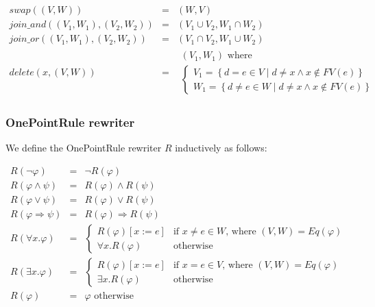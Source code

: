 \begin{equation*}
\begin{array}{lll}
swap\left( \left( V,W\right) \right) & = & \left( W,V\right) \\ 
join\_and\left( \left( V_{1},W_{1}\right) ,\left( V_{2},W_{2}\right) \right)
& = & \left( V_{1}\cup V_{2},W_{1}\cap W_{2}\right) \\ 
join\_or\left( \left( V_{1},W_{1}\right) ,\left( V_{2},W_{2}\right) \right)
& = & \left( V_{1}\cap V_{2},W_{1}\cup W_{2}\right) \\ 
delete\left( x,\left( V,W\right) \right) & = & 
\begin{array}{l}
\left( V_{1},W_{1}\right) \text{ where} \\ 
\left\{ 
\begin{array}{c}
V_{1}=\left\{ d=e\in V\mid d\neq x\wedge x\notin FV(e)\right\} \\ 
W_{1}=\left\{ d\neq e\in W\mid d\neq x\wedge x\notin FV(e)\right\}%
\end{array}%
\right.%
\end{array}%
\end{array}%
\end{equation*}

\subsubsection{OnePointRule rewriter}

We define the OnePointRule rewriter $R$ inductively as follows:

\begin{equation*}
\begin{array}{lll}
R\left( \lnot \varphi \right) & = & \lnot R\left( \varphi \right) \\ 
R\left( \varphi \wedge \psi \right) & = & R\left( \varphi \right) \wedge
R\left( \psi \right) \\ 
R\left( \varphi \vee \psi \right) & = & R\left( \varphi \right) \vee R\left(
\psi \right) \\ 
R\left( \varphi \Rightarrow \psi \right) & = & R\left( \varphi \right)
\Rightarrow R\left( \psi \right) \\ 
R\left( \forall x.\varphi \right) & = & \left\{ 
\begin{array}{cc}
R\left( \varphi \right) \left[ x:=e\right] & \text{if }x\neq e\in W\text{,
where }\left( V,W\right) =Eq\left( \varphi \right) \\ 
\forall x.R\left( \varphi \right) & \text{otherwise}%
\end{array}%
\right. \\ 
R\left( \exists x.\varphi \right) & = & \left\{ 
\begin{array}{cc}
R\left( \varphi \right) \left[ x:=e\right] & \text{if }x=e\in V\text{, where 
}\left( V,W\right) =Eq\left( \varphi \right) \\ 
\exists x.R\left( \varphi \right) & \text{otherwise}%
\end{array}%
\right. \\ 
R\left( \varphi \right) & = & \varphi \text{ otherwise}%
\end{array}%
\end{equation*}

